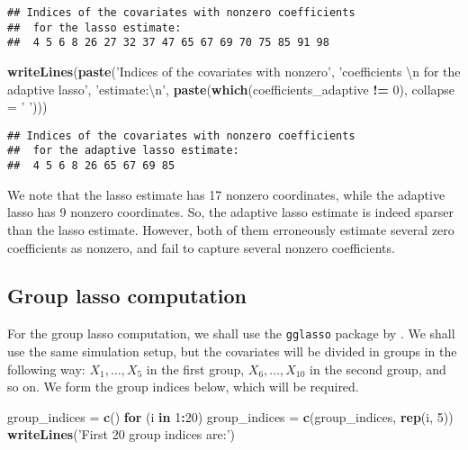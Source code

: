 \documentclass[
]{book}
\newenvironment{Shaded}{\begin{snugshade}}{\end{snugshade}}
\newcommand{\CharTok}[1]{\textcolor[rgb]{0.31,0.60,0.02}{#1}}
\newcommand{\ControlFlowTok}[1]{\textcolor[rgb]{0.13,0.29,0.53}{\textbf{#1}}}
\newcommand{\DataTypeTok}[1]{\textcolor[rgb]{0.13,0.29,0.53}{#1}}
\newcommand{\DecValTok}[1]{\textcolor[rgb]{0.00,0.00,0.81}{#1}}
\newcommand{\KeywordTok}[1]{\textcolor[rgb]{0.13,0.29,0.53}{\textbf{#1}}}
\newcommand{\NormalTok}[1]{#1}
\newcommand{\OperatorTok}[1]{\textcolor[rgb]{0.81,0.36,0.00}{\textbf{#1}}}
\newcommand{\StringTok}[1]{\textcolor[rgb]{0.31,0.60,0.02}{#1}}
\begin{document}
\begin{verbatim}
## Indices of the covariates with nonzero coefficients 
##  for the lasso estimate:
##  4 5 6 8 26 27 32 37 47 65 67 69 70 75 85 91 98
\end{verbatim}

\begin{Shaded}
\begin{Highlighting}[]
\KeywordTok{writeLines}\NormalTok{(}\KeywordTok{paste}\NormalTok{(}\StringTok{'Indices of the covariates with nonzero'}\NormalTok{,}
                 \StringTok{'coefficients }\CharTok{\textbackslash{}n}\StringTok{ for the adaptive lasso'}\NormalTok{,}
                 \StringTok{'estimate:}\CharTok{\textbackslash{}n}\StringTok{'}\NormalTok{,}
                 \KeywordTok{paste}\NormalTok{(}\KeywordTok{which}\NormalTok{(coefficients_adaptive }\OperatorTok{!=}\StringTok{ }\DecValTok{0}\NormalTok{),}
                       \DataTypeTok{collapse =} \StringTok{' '}\NormalTok{)))}
\end{Highlighting}
\end{Shaded}

\begin{verbatim}
## Indices of the covariates with nonzero coefficients 
##  for the adaptive lasso estimate:
##  4 5 6 8 26 65 67 69 85
\end{verbatim}

We note that the lasso estimate has 17 nonzero coordinates, while the adaptive lasso has 9 nonzero coordinates. So, the adaptive lasso estimate is indeed sparser than the lasso estimate. However, both of them erroneously estimate several zero coefficients as nonzero, and fail to capture several nonzero coefficients.

\hypertarget{grouplasso-computation}{%
\subsection{Group lasso computation}\label{grouplasso-computation}}

For the group lasso computation, we shall use the \texttt{gglasso} package by \citet{R-gglasso}. We shall use the same simulation setup, but the covariates will be divided in groups in the following way: \(X_1, \ldots, X_5\) in the first group, \(X_6, \ldots, X_10\) in the second group, and so on. We form the group indices below, which will be required.

\begin{Shaded}
\begin{Highlighting}[]
\NormalTok{group_indices =}\StringTok{ }\KeywordTok{c}\NormalTok{()}
\ControlFlowTok{for}\NormalTok{ (i }\ControlFlowTok{in} \DecValTok{1}\OperatorTok{:}\DecValTok{20}\NormalTok{)}
\NormalTok{  group_indices =}\StringTok{ }\KeywordTok{c}\NormalTok{(group_indices, }\KeywordTok{rep}\NormalTok{(i, }\DecValTok{5}\NormalTok{))}
\KeywordTok{writeLines}\NormalTok{(}\StringTok{'First 20 group indices are:'}\NormalTok{)}
\end{Highlighting}
\end{Shaded}
\end{document}
